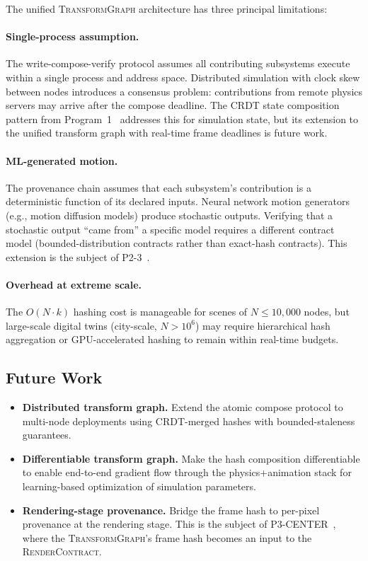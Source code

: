 \documentclass[sigconf,nonacm]{acmart}
\newcommand{\transformgraph}{\textsc{TransformGraph}}
\begin{document}
The unified \transformgraph{} architecture has three principal
limitations:

\paragraph{Single-process assumption.}
The write-compose-verify protocol assumes all contributing
subsystems execute within a single process and address space.
Distributed simulation with clock skew between nodes introduces
a consensus problem: contributions from remote physics servers
may arrive after the compose deadline. The CRDT state composition
pattern from Program~1~\cite{trustbyconstruction2026} addresses
this for simulation state, but its extension to the unified
transform graph with real-time frame deadlines is future work.

\paragraph{ML-generated motion.}
The provenance chain assumes that each subsystem's contribution
is a deterministic function of its declared inputs. Neural
network motion generators (e.g., motion diffusion models) produce
stochastic outputs. Verifying that a stochastic output ``came
from'' a specific model requires a different contract model
(bounded-distribution contracts rather than exact-hash contracts).
This extension is the subject of
P2-3~\cite{paper-9-motion-asia2027}.

\paragraph{Overhead at extreme scale.}
The $O(N \cdot k)$ hashing cost is manageable for scenes of
$N \leq 10{,}000$ nodes, but large-scale digital twins
(city-scale, $N > 10^6$) may require hierarchical hash
aggregation or GPU-accelerated hashing to remain within
real-time budgets.

\subsection{Future Work}

\begin{itemize}
  \item \textbf{Distributed transform graph.} Extend the atomic
    compose protocol to multi-node deployments using CRDT-merged
    hashes with bounded-staleness guarantees.
  \item \textbf{Differentiable transform graph.} Make the hash
    composition differentiable to enable end-to-end gradient
    flow through the physics+animation stack for learning-based
    optimization of simulation parameters.
  \item \textbf{Rendering-stage provenance.} Bridge the frame
    hash to per-pixel provenance at the rendering stage. This
    is the subject of P3-CENTER~\cite{paper-13-dumbglass-siggraph2028},
    where the \transformgraph{}'s frame hash becomes an input
    to the \textsc{RenderContract}.
\end{itemize}
\end{document}
